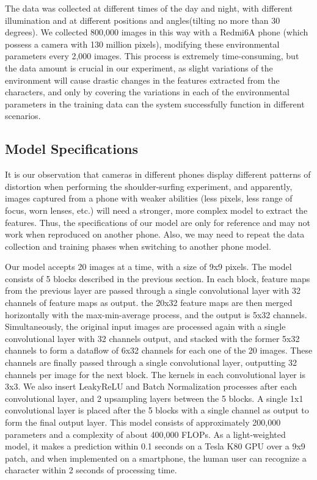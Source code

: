 The data was collected at different times of the day and night, with different illumination and at different positions and angles(tilting no more than 30 degrees). We collected 800,000 images in this way with a Redmi6A phone (which possess a camera with 130 million pixels), modifying these environmental parameters every 2,000 images. This process is extremely time-consuming, but the data amount is crucial in our experiment, as slight variations of the environment will cause drastic changes in the features extracted from the characters, and only by covering the variations in each of the environmental parameters in the training data can the system successfully function in different scenarios.

\subsection{Model Specifications}
It is our observation that cameras in different phones display different patterns of distortion when performing the shoulder-surfing experiment, and apparently, images captured from a phone with weaker abilities (less pixels, less range of focus, worn lenses, etc.) will need a stronger, more complex model to extract the features. Thus, the specifications of our model are only for reference and may not work when reproduced on another phone. Also, we may need to repeat the data collection and training phases when switching to another phone model.

Our model accepts 20 images at a time, with a size of 9x9 pixels. The model consists of 5 blocks described in the previous section. In each block, feature maps from the previous layer are passed through a single convolutional layer with 32 channels of feature maps as output. the 20x32 feature maps are then merged horizontally with the max-min-average process, and the output is 5x32 channels. Simultaneously, the original input images are processed again with a single convolutional layer with 32 channels output, and stacked with the former 5x32 channels to form a dataflow of 6x32 channels for each one of the 20 images. These channels are finally passed through a single convolutional layer, outputting 32 channels per image for the next block. The kernels in each convolutional layer is 3x3. We also insert LeakyReLU and Batch Normalization processes after each convolutional layer, and 2 upsampling layers between the 5 blocks. A single 1x1 convolutional layer is placed after the 5 blocks with a single channel as output to form the final output layer. This model consists of approximately 200,000 parameters and a complexity of about 400,000 FLOPs. As a light-weighted model, it makes a prediction within 0.1 seconds on a Tesla K80 GPU over a 9x9 patch, and when implemented on a smartphone, the human user can recognize a character within 2 seconds of processing time.